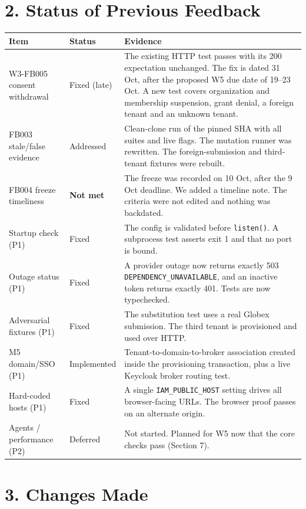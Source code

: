 \documentclass{article}
\begin{document}
\section*{2. Status of Previous Feedback}
\begin{tabularx}{\textwidth}{@{}l l Y@{}}
\toprule
\textbf{Item} & \textbf{Status} & \textbf{Evidence} \\
\midrule
W3-FB005 consent withdrawal & Fixed (late) & The existing HTTP test passes with its 200 expectation unchanged. The fix is dated 31 Oct, after the proposed W5 due date of 19--23 Oct. A new test covers organization and membership suspension, grant denial, a foreign tenant and an unknown tenant. \\
FB003 stale/false evidence & Addressed & Clean-clone run of the pinned SHA with all suites and live flags. The mutation runner was rewritten. The foreign-submission and third-tenant fixtures were rebuilt. \\
FB004 freeze timeliness & \textbf{Not met} & The freeze was recorded on 10 Oct, after the 9 Oct deadline. We added a timeline note. The criteria were not edited and nothing was backdated. \\
Startup check (P1) & Fixed & The config is validated before \texttt{listen()}. A subprocess test asserts exit 1 and that no port is bound. \\
Outage status (P1) & Fixed & A provider outage now returns exactly 503 \texttt{DEPENDENCY\_UNAVAILABLE}, and an inactive token returns exactly 401. Tests are now typechecked. \\
Adversarial fixtures (P1) & Fixed & The substitution test uses a real Globex submission. The third tenant is provisioned and used over HTTP. \\
M5 domain/SSO (P1) & Implemented & Tenant-to-domain-to-broker association created inside the provisioning transaction, plus a live Keycloak broker routing test. \\
Hard-coded hosts (P1) & Fixed & A single \texttt{IAM\_PUBLIC\_HOST} setting drives all browser-facing URLs. The browser proof passes on an alternate origin. \\
Agents / performance (P2) & Deferred & Not started. Planned for W5 now that the core checks pass (Section 7). \\
\bottomrule
\end{tabularx}

\section*{3. Changes Made}
\end{document}
